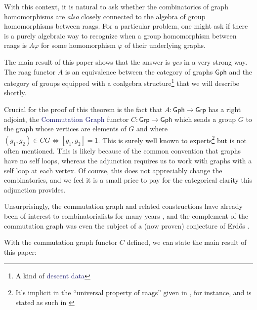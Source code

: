 \documentclass[12pt]{article}
\theoremstyle{definition}
\theoremstyle{theorem}
\newcommand*{\catFont}[1]{\mathsf{#1}}
\newcommand{\Grp}{\catFont{Grp}}
\newcommand*{\important}[1]{\textcolor{MidnightBlue}{#1}}
\begin{document}
  With this context, it is natural to ask whether the combinatorics
  of graph homomorphisms are \emph{also} closely connected to the algebra of
  group homomorphisms between raags. For a particular problem, one might ask 
  if there is a purely algebraic way to recognize when a group homomorphism 
  between raags is $A \varphi$ for some homomorphism $\varphi$ of their 
  underlying graphs.

  The main result of this paper shows
  that the answer is \emph{yes} in a very strong way. The raag functor $A$ 
  is an equivalence between the category of graphs $\mathsf{Gph}$ and the 
  category of groups equipped with a coalgebra structure\footnote{A kind of \important{descent data}}
  that we will describe shortly.

  Crucial for the proof of this theorem is the fact that 
  $A : \mathsf{Gph} \to \Grp$ has a right adjoint, the \important{Commutation Graph}
  functor $C : \Grp \to \mathsf{Gph}$ which sends a group $G$ to the graph 
  whose vertices are elements of $G$ and where $(g_1,g_2) \in CG \iff [g_1,g_2]=1$. 
  This is surely well known to 
  experts\footnote{It's implicit in the ``universal property of raags'' given 
  in \cite{koberdaRIGHTANGLEDARTINGROUPS}, for instance, and is stated as
  such in \cite{servatiusAutomorphismsGraphGroups1989}} but is not often 
  mentioned. This is likely because of the common convention that graphs 
  have no self loops, whereas the adjunction requires us to work with graphs
  with a self loop at each vertex. Of course, this does not appreciably 
  change the combinatorics, and we feel it is a small price to pay for the 
  categorical clarity this adjunction provides.

  Unsurprisingly, the commutation graph and related constructions have already 
  been of interest to combinatorialists for many years 
  \cite{baumeisterCommutingGraphsOdd2009,
  dolinarMaximalDistancesCommuting2012,
  giudiciDiametersCommutingGraphs2010,
  arvindRecognizingCommutingGraph2022,
  cameronGraphsDefinedGroups2022}, and the complement of the commutation 
  graph was even the subject of a (now proven) conjecture of Erd\H{o}s
  \cite{neumannProblemPaulErdos1976}.

  With the commutation graph functor $C$ defined, we can state the main result
  of this paper:

  \newpage
\end{document}
